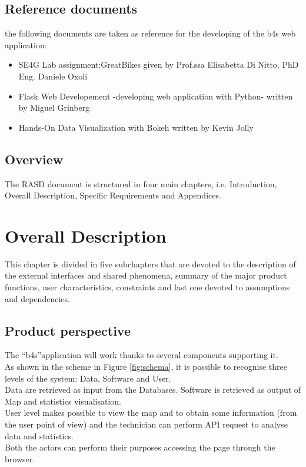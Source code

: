 \documentclass{article}
\begin{document}
\subsection{Reference documents}
the following documents are taken as reference for the developing of the b4s web application:
\begin{itemize}
    \item SE4G Lab assignment:GreatBikes given by Prof.ssa Elisabetta Di Nitto, PhD Eng. Daniele Oxoli
    \item Flask Web Developement -developing web application with Python- written by Miguel Grinberg
    \item Hands-On Data Visualization with Bokeh written by Kevin Jolly 
\end{itemize}


\subsection{Overview}
The RASD document is structured in four main chapters, i.e. Introduction, Overall Description, Specific Requirements and Appendices. 

\section{Overall Description}
This chapter is divided in five subchapters that are devoted to the description of the external interfaces and shared phenomena, summary of the major product functions, user characteristics, constraints and last one devoted to assumptions and dependencies.
\subsection{Product perspective}
The “b4s”application will work thanks to several components supporting it.\\ As shown in the scheme in Figure \ref{fig:schema}, it is possible to recognise three levels of the system: Data, Software and User.\\ 
Data are retrieved as input from the Databases.
Software is retrieved as output of Map and statistics visualisation.\\
User level makes possible to view the map and to obtain some information (from the user point of view) and the technician can perform API request to analyse data and statistics.\\ Both the actors can perform their purposes accessing the page through the browser.\\
\end{document}
